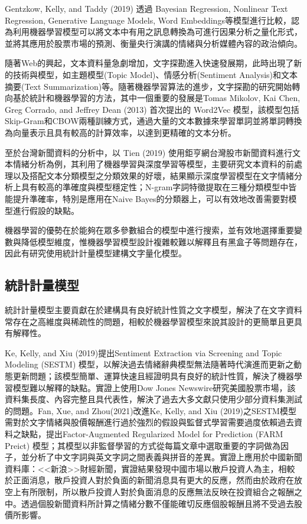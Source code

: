 Gentzkow, Kelly, and Taddy (2019) 透過 Bayesian Regression, Nonlinear Text Regression, Generative Language Models, Word Embeddings等模型進行比較，認為利用機器學習模型可以將文本中有用之訊息轉換為可進行因果分析之量化形式，並將其應用於股票市場的預測、衡量央行演講的情緒與分析媒體內容的政治傾向。

隨著Web的興起，文本資料量急劇增加，文字探勘進入快速發展期，此時出現了新的技術與模型，如主題模型(Topic Model)、情感分析(Sentiment Analysis)和文本摘要(Text Summarization)等。隨著機器學習算法的進步，文字探勘的研究開始轉向基於統計和機器學習的方法，其中一個重要的發展是Tomas Mikolov, Kai Chen, Greg Corrado, and Jeffrey Dean (2013) 首次提出的 Word2Vec 模型，該模型包括Skip-Gram和CBOW兩種訓練方式，通過大量的文本數據來學習單詞並將單詞轉換為向量表示且具有較高的計算效率，以達到更精確的文本分析。

至於台灣新聞資料的分析中，以 Tien (2019) 使用鉅亨網台灣股市新聞資料進行文本情緒分析為例，其利用了機器學習與深度學習等模型，主要研究文本資料的前處理以及搭配文本分類模型之分類效果的好壞，結果顯示深度學習模型在文字情緒分析上具有較高的準確度與模型穩定性；N-gram字詞特徵提取在三種分類模型中皆能提升準確率，特別是應用在Naive Bayes的分類器上，可以有效地改善需要對模型進行假設的缺點。

機器學習的優勢在於能夠在眾多參數組合的模型中進行搜索，並有效地選擇重要變數與降低模型維度，惟機器學習模型設計複雜較難以解釋且有黑盒子等問題存在，因此有研究使用統計計量模型建構文字量化模型。

\subsection{統計計量模型}
統計計量模型主要貢獻在於建構具有良好統計性質之文字模型，解決了在文字資料常存在之高維度與稀疏性的問題，相較於機器學習模型來說其設計的更簡單且更具有解釋性。

Ke, Kelly, and Xiu (2019)提出Sentiment Extraction via Screening and Topic Modeling (SESTM) 模型，以解決過去情緒辭典模型無法隨著時代演進而更新之動態更新問題；該模型簡單、運算快速且經證明具有良好的統計性質，解決了機器學習模型難以解釋的缺點。實證上使用Dow Jones Newswire研究美國股票市場，該資料集長度、內容完整且具代表性，解決了過去大多文獻只使用少部分資料集測試的問題。Fan, Xue, and Zhou(2021)改進Ke, Kelly, and Xiu (2019)之SESTM模型需對於文字情緒與股價報酬進行過於強烈的假設與監督式學習需要過度依賴過去資料之缺點，提出Factor-Augmented Regularized Model for Prediction (FARM Preict) 模型；其模型以非監督學習的方式從每篇文章中選取重要的字詞做為因子，並分析了中文字詞與英文字詞之間表義與拼音的差異。實證上應用於中國新聞資料庫：<<新浪>>財經新聞，實證結果發現中國市場以散戶投資人為主，相較於正面消息，散戶投資人對於負面的新聞消息具有更大的反應，然而由於政府在放空上有所限制，所以散戶投資人對於負面消息的反應無法反映在投資組合之報酬之中。透過個股新聞資料所計算之情緒分數不僅能確切反應個股報酬且將不受過去股價所影響。



